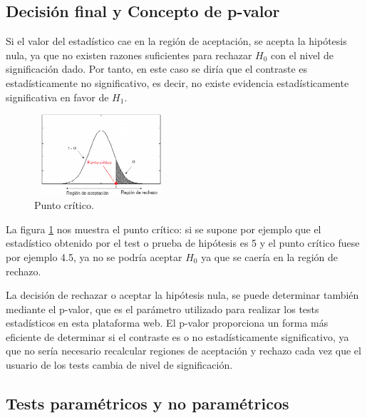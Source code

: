 \subsection{Decisión final y Concepto de p-valor}
Si el valor del estadístico cae en la región de aceptación, se acepta la hipótesis nula, ya que no existen
razones suficientes para rechazar $H_0$ con el nivel de significación dado. Por tanto, en este caso se diría
que el contraste es estadísticamente no significativo, es decir, no existe evidencia estadísticamente significativa
en favor de $H_1$.
\begin{figure}[h]
\centering
\includegraphics[width=5cm,height=3cm]{figuras/test_unilateral_critico.png}
\caption{Punto crítico.}
\label{fig:punto_critico}
\end{figure}
La figura \ref{fig:punto_critico} nos muestra el punto crítico: si se supone por ejemplo que el estadístico
obtenido por el test o prueba de hipótesis es 5 y el punto crítico fuese por ejemplo 4.5, ya no se podría
aceptar $H_0$ ya que se caería en la región de rechazo.

La decisión de rechazar o aceptar la hipótesis nula, se puede determinar también mediante el p-valor,
que es el parámetro utilizado para realizar los tests estadísticos en esta plataforma web. El p-valor proporciona
un forma más eficiente de determinar si el contraste es o no estadísticamente significativo, ya que no sería
necesario recalcular regiones de aceptación y rechazo cada vez que el usuario de los tests cambia de nivel de
significación.


\subsection{Tests paramétricos y no paramétricos}


